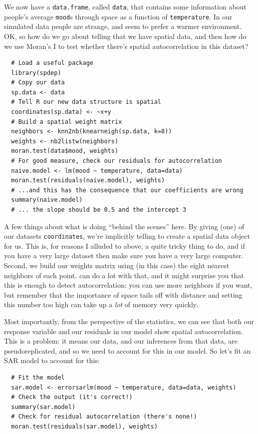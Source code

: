 We now have a \texttt{data.frame}, called \texttt{data}, that contains
some information about people's average \texttt{mood}s through space
as a function of \texttt{temperature}. In our simulated data people
are strange, and seem to prefer a warmer environment. OK, so how do we
go about telling \R that we have spatial data, and then how do we use
Moran's I to test whether there's spatial autocorrelation in this
dataset?

\begin{verbatim}
  # Load a useful package
  library(spdep)
  # Copy our data
  sp.data <- data
  # Tell R our new data structure is spatial
  coordinates(sp.data) <- ~x+y
  # Build a spatial weight matrix
  neighbors <- knn2nb(knearneigh(sp.data, k=8))
  weights <- nb2listw(neighbors)
  moran.test(data$mood, weights)
  # For good measure, check our residuals for autocorrelation
  naive.model <- lm(mood ~ temperature, data=data)
  moran.test(residuals(naive.model), weights)
  # ...and this has the consequence that our coefficients are wrong
  summary(naive.model)
  # ... the slope should be 0.5 and the intercept 3
\end{verbatim}%

A few things about what \R is doing ``behind the scenes'' here. By
giving (one) of our datasets \texttt{coordinates}, we're implicitly
telling \R to create a spatial data object for us. This is, for
reasons I alluded to above, a quite tricky thing to do, and if you
have a very large dataset then make sure you have a very large
computer. Second, we build our weights matrix using (in this case) the
eight nearest neighbors of each point. \R can do a lot with that, and
it might surprise you that this is enough to detect autocorrelation:
you can use more neighbors if you want, but remember that the
importance of space tails off with distance and setting this number
too high can take up a \emph{lot} of memory very quickly.

Most importantly, from the perspective of the statistics, we can see
that both our response variable and our residuals in our model show
spatial autocorrelation. This is a problem: it means our data, and our
inferences from that data, are pseudoreplicated, and so we need to
account for this in our model. So let's fit an SAR model to account
for this:

\begin{verbatim}
  # Fit the model
  sar.model <- errorsarlm(mood ~ temperature, data=data, weights)
  # Check the output (it's correct!)
  summary(sar.model)
  # Check for residual autocorrelation (there's none!)
  moran.test(residuals(sar.model), weights)
\end{verbatim}

